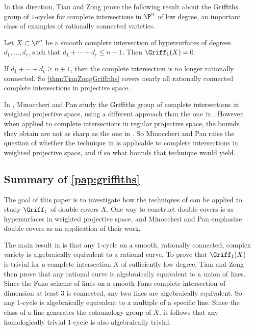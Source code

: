 In this direction, Tian and Zong prove the following result about the Griffiths group of $1$-cycles for complete intersections in $\P^n$ of low degree, an important class of examples of rationally connected varieties.
\begin{theorem}
	\label{thm:TianZongGriffiths}
	Let $X \subset \P^n$ be a smooth complete intersection of hypersurfaces of degrees $d_1,\dots,d_c$, such that $d_1 + \cdots + d_c \leq n-1$. Then $\Griff_1(X) = 0$.
\end{theorem}
If $d_1 + \cdots + d_c \geq n+1$, then the complete intersection is no longer rationally connected. So \cref{thm:TianZongGriffiths} covers nearly all rationally connected complete intersections in projective space.

In \cite{MinoccheriPan}, Minoccheri and Pan study the Griffiths group of complete intersections in weighted projective space, using a different approach than the one in \cite{TianZong}. However, when applied to complete intersections in regular projective space, the bounds they obtain are not as sharp as the one in \cite{TianZong}. So Minoccheri and Pan raise the question of whether the technique in \cite{TianZong} is applicable to complete intersections in weighted projective space, and if so what bounds that technique would yield.

\subsection{Summary of \cref{pap:griffiths}}
The goal of this paper is to investigate how the techniques of \cite{TianZong} can be applied to study $\Griff_1$ of double covers $X$. One way to construct double covers is as hypersurfaces in weighted projective space, and Minoccheri and Pan emphasize double covers as an application of their work.

The main result in \cite{TianZong} is that any $1$-cycle on a smooth, rationally connected, complex variety is algebraically equivalent to a rational curve. To prove that $\Griff_1(X)$ is trivial for a complete intersection $X$ of sufficiently low degree, Tian and Zong then prove that any rational curve is algebraically equivalent to a union of lines. Since the Fano scheme of lines on a smooth Fano complete intersection of dimension at least $3$ is connected, any two lines are algebraically equivalent. So any 1-cycle is algebraically equivalent to a multiple of a specific line. Since the class of a line generates the cohomology group of $X$, it follows that any homologically trivial $1$-cycle is also algebraically trivial.

